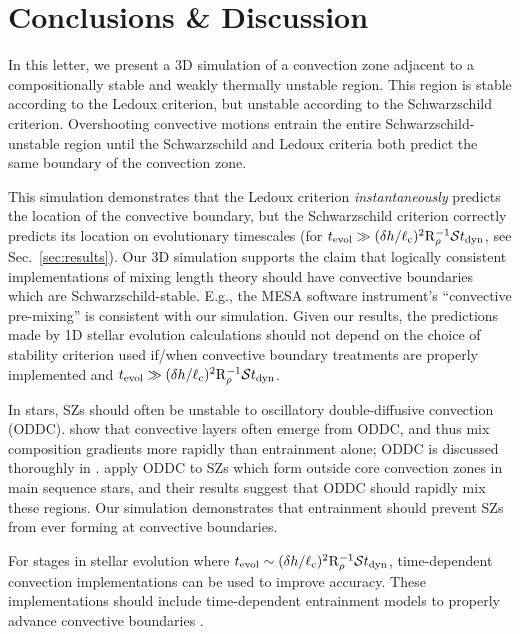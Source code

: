 \section{Conclusions \& Discussion}
\label{sec:conclusions}

In this letter, we present a 3D simulation of a convection zone adjacent to a compositionally stable and weakly thermally unstable region.
This region is stable according to the Ledoux criterion, but unstable according to the Schwarzschild criterion.
Overshooting convective motions entrain the entire Schwarzschild-unstable region until the Schwarzschild and Ledoux criteria both predict the same boundary of the convection zone.

This simulation demonstrates that the Ledoux criterion \emph{instantaneously} predicts the location of the convective boundary, but the Schwarzschild criterion correctly predicts its location on evolutionary timescales (for $t_{\rm{evol}} \gg (\delta h / \ell_{\rm{c}})^2\mathrm{R}_{\rho}^{-1}\mathcal{S} t_{\rm{dyn}}$, see Sec.~\ref{sec:results}).
Our 3D simulation supports the claim that logically consistent implementations of mixing length theory \citep{gabriel_etal_2014, mesa4, mesa5} should have convective boundaries which are Schwarzschild-stable.
E.g., the MESA software instrument's ``convective pre-mixing'' \citep[CPM,][]{mesa5} is consistent with our simulation.
Given our results, the predictions made by 1D stellar evolution calculations should not depend on the choice of stability criterion used if/when convective boundary treatments are properly implemented and $t_{\rm{evol}} \gg (\delta h / \ell_{\rm{c}})^2\mathrm{R}_{\rho}^{-1}\mathcal{S} t_{\rm{dyn}}$.

In stars, SZs should often be unstable to oscillatory double-diffusive convection (ODDC).
\citet{mirouh_etal_2012} show that convective layers often emerge from ODDC, and thus mix composition gradients more rapidly than entrainment alone; ODDC is discussed thoroughly in \citet{garaud_2018}.
\citet{moore_garaud_2016} apply ODDC to SZs which form outside core convection zones in main sequence stars, and their results suggest that ODDC should rapidly mix these regions.
Our simulation demonstrates that entrainment should prevent SZs from ever forming at convective boundaries.

For stages in stellar evolution where ${t_{\rm{evol}} \sim (\delta h / \ell_{\rm{c}})^2\mathrm{R}_{\rho}^{-1}\mathcal{S} t_{\rm{dyn}}}$, time-dependent convection \citep[TDC,][]{tdc_1986} implementations can be used to improve accuracy.
These implementations should include time-dependent entrainment models to properly advance convective boundaries \citep[e.g.,][]{turner_1968, fuentes_cumming_2020}.

